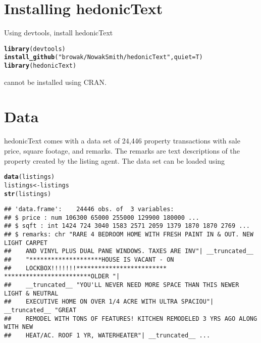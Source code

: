 \documentclass{article}\usepackage[]{graphicx}\usepackage[]{color}
\makeatletter
\newcommand{\hlstr}[1]{\textcolor[rgb]{0.192,0.494,0.8}{#1}}%
\newcommand{\hlstd}[1]{\textcolor[rgb]{0.345,0.345,0.345}{#1}}%
\newcommand{\hlkwb}[1]{\textcolor[rgb]{0.69,0.353,0.396}{#1}}%
\newcommand{\hlkwc}[1]{\textcolor[rgb]{0.333,0.667,0.333}{#1}}%
\newcommand{\hlkwd}[1]{\textcolor[rgb]{0.737,0.353,0.396}{\textbf{#1}}}%
\newenvironment{kframe}{%
 \def\at@end@of@kframe{}%
 \ifinner\ifhmode%
  \def\at@end@of@kframe{\end{minipage}}%
  \begin{minipage}{\columnwidth}%
 \fi\fi%
 \def\FrameCommand##1{\hskip\@totalleftmargin \hskip-\fboxsep
 \colorbox{shadecolor}{##1}\hskip-\fboxsep
     \hskip-\linewidth \hskip-\@totalleftmargin \hskip\columnwidth}%
 \MakeFramed {\advance\hsize-\width
   \@totalleftmargin\z@ \linewidth\hsize
   \@setminipage}}%
 {\par\unskip\endMakeFramed%
 \at@end@of@kframe}
\newenvironment{knitrout}{}{} %
\newcommand{\pkg}[1]{{\fontseries{b}\selectfont #1}}
\makeatother
\begin{document}
\section{Installing \pkg{hedonicText}}
Using \pkg{devtools}, install \pkg{hedonicText}
\begin{knitrout}\footnotesize
{}\color{fgcolor}\begin{kframe}
\begin{alltt}
\hlkwd{library}\hlstd{(devtools)}
\hlkwd{install_github}\hlstd{(}\hlstr{"browak/NowakSmith/hedonicText"} \hlstd{,} \hlkwc{quiet}\hlstd{=T)}
\hlkwd{library}\hlstd{(hedonicText)}
\end{alltt}
\end{kframe}
\end{knitrout}
\noindent \pkg{hedonicText} cannot be installed using CRAN.

\section{Data}
\pkg{hedonicText} comes with a data set of 24,446 property transactions with sale price, square footage, and remarks.  The remarks are text descriptions of the property created by the listing agent.  The data set can be loaded using
\begin{knitrout}\footnotesize
{}\color{fgcolor}\begin{kframe}
\begin{alltt}
\hlkwd{data}\hlstd{(listings)}
\hlstd{listings} \hlkwb{<-} \hlstd{listings}
\hlkwd{str}\hlstd{(listings)}
\end{alltt}
\begin{verbatim}
## 'data.frame':	24446 obs. of  3 variables:
## $ price : num 106300 65000 255000 129900 180000 ...
## $ sqft : int 1424 724 3040 1583 2571 2059 1379 1870 1870 2769 ...
## $ remarks: chr "RARE 4 BEDROOM HOME WITH FRESH PAINT IN & OUT. NEW LIGHT CARPET
##    AND VINYL PLUS DUAL PANE WINDOWS. TAXES ARE INV"| __truncated__
##    "********************HOUSE IS VACANT - ON
##    LOCKBOX!!!!!!!************************* ************************OLDER "|
##    __truncated__ "YOU'LL NEVER NEED MORE SPACE THAN THIS NEWER LIGHT & NEUTRAL
##    EXECUTIVE HOME ON OVER 1/4 ACRE WITH ULTRA SPACIOU"| __truncated__ "GREAT
##    REMODEL WITH TONS OF FEATURES! KITCHEN REMODELED 3 YRS AGO ALONG WITH NEW
##    HEAT/AC. ROOF 1 YR, WATERHEATER"| __truncated__ ...
\end{verbatim}
\end{kframe}
\end{knitrout}
\end{document}
